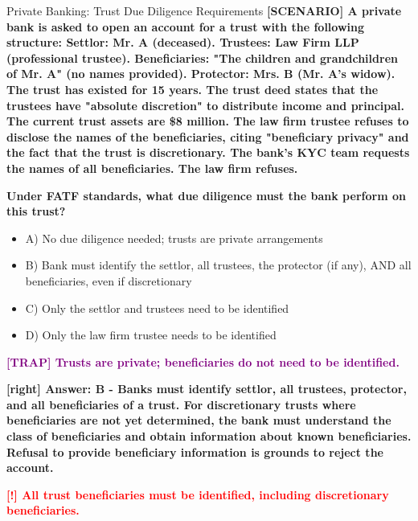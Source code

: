 \documentclass[11pt,a4paper]{beamer}
\newcommand{\redflag}[1]{\textcolor{red}{\textbf{[!] #1}}}
\newcommand{\trap}[1]{\textcolor{purple}{\textbf{[TRAP] #1}}}
\newcommand{\correct}[1]{\textcolor{green!50!black}{\textbf{[right] #1}}}
\newcommand{\scenario}[1]{\textcolor{blue!70!black}{\textbf{[SCENARIO] #1}}}
\begin{document}
	
	\begin{frame}{Private Banking: Trust Due Diligence Requirements}
		\tiny
		\scenario{A private bank is asked to open an account for a trust with the following structure: Settlor: Mr. A (deceased). Trustees: Law Firm LLP (professional trustee). Beneficiaries: "The children and grandchildren of Mr. A" (no names provided). Protector: Mrs. B (Mr. A's widow). The trust has existed for 15 years. The trust deed states that the trustees have "absolute discretion" to distribute income and principal. The current trust assets are \$8 million. The law firm trustee refuses to disclose the names of the beneficiaries, citing "beneficiary privacy" and the fact that the trust is discretionary. The bank's KYC team requests the names of all beneficiaries. The law firm refuses.}
		
		\vspace{0.02cm}
		\textbf{Under FATF standards, what due diligence must the bank perform on this trust?}
		\vspace{0.02cm}
		
		\begin{itemize}
			\item A) No due diligence needed; trusts are private arrangements
			\item B) Bank must identify the settlor, all trustees, the protector (if any), AND all beneficiaries, even if discretionary
			\item C) Only the settlor and trustees need to be identified
			\item D) Only the law firm trustee needs to be identified
		\end{itemize}
		
		\vspace{0.02cm}
		\trap{Trusts are private; beneficiaries do not need to be identified.}
		
		\vspace{0.02cm}
		\correct{Answer: B - Banks must identify settlor, all trustees, protector, and all beneficiaries of a trust. For discretionary trusts where beneficiaries are not yet determined, the bank must understand the class of beneficiaries and obtain information about known beneficiaries. Refusal to provide beneficiary information is grounds to reject the account.}
		
		\vspace{0.02cm}
		\redflag{All trust beneficiaries must be identified, including discretionary beneficiaries.}
	\end{frame}
	
\end{document}
